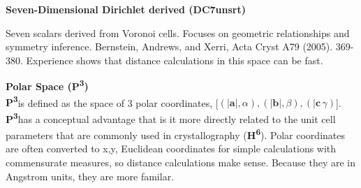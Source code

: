 \documentclass[12pt]{article}
\newcommand{\HVI}{\textbf{H\textsuperscript{6}}}
\newcommand{\PVI}{\textbf{P\textsuperscript{3}}}
\newcommand{\va}{\ensuremath{\mathbf{a}}}
\newcommand{\vb}{\ensuremath{\mathbf{b}}}
\newcommand{\vc}{\ensuremath{\mathbf{c}}}
\begin{document}
	
	\vspace{1cm}
	
	\noindent
	\parbox[t]{0.48\textwidth}{
		\tcolorbox[title=DC7unsrt – Dirichlet 7\, unsorted]
		\textbf{Seven-Dimensional Dirichlet derived (DC7unsrt)}
		
		Seven scalars derived from Voronoi cells. Focuses on geometric relationships and symmetry inference.
		Bernstein, Andrews, and Xerri, Acta Cryst A79 (2005). 369-380. Experience shows
		that distance calculations in this space can be fast.
		\endtcolorbox
		
		
		
		
		
	}
	\hfill
	\parbox[t]{0.48\textwidth}{
	\tcolorbox[title=\PVI{} – Polar Space]
	\textbf{Polar Space (\PVI{})} \\
	\PVI is defined as the space of 3 polar coordinates, [\ensuremath{
	(|\va|,\alpha), 
	(|\vb|,\beta), 
	(|\vc\,\gamma)}]. \\
	\PVI has a conceptual advantage that is it more directly related to the 
	unit cell parameters that are commonly used in crystallography 
	(\HVI{}). Polar coordinates are often converted to x,y, Euclidean 
	coordinates for simple calculations with commensurate measures, so distance calculations make sense.
	 Because they are in Angstrom units, they are more
	familar. 
	\endtcolorbox
}

	
\end{document}
